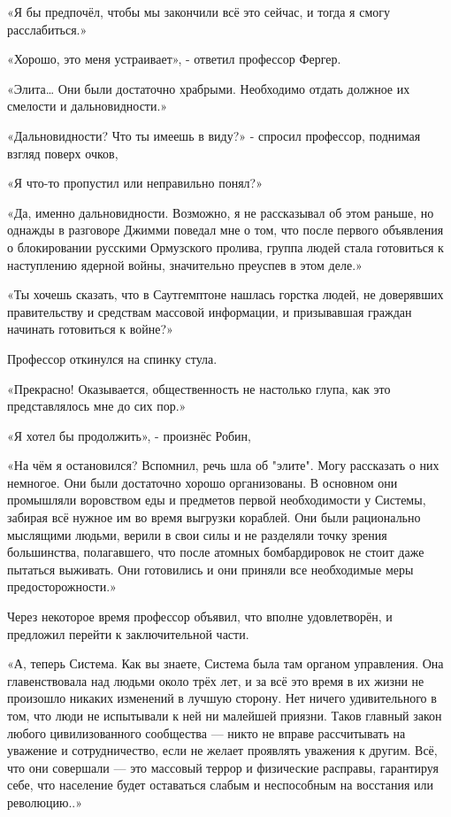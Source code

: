 \documentclass[a4paper,12pt]{book}
\begin{document}
\par
«Я бы предпочёл, чтобы мы закончили всё это сейчас, и тогда я смогу расслабиться.»
\par
«Хорошо, это меня устраивает», - ответил профессор Фергер.
\par
«Элита… Они были достаточно храбрыми. Необходимо отдать должное их смелости и дальновидности.»
\par
«Дальновидности? Что ты имеешь в виду?» - спросил профессор, поднимая взгляд поверх очков,
\par
«Я что-то пропустил или неправильно понял?»
\par
«Да, именно дальновидности. Возможно, я не рассказывал об этом раньше, но однажды в разговоре Джимми поведал мне о том, что после первого объявления о блокировании русскими Ормузского пролива, группа людей стала готовиться к наступлению ядерной войны, значительно преуспев в этом деле.»
\par
«Ты хочешь сказать, что в Саутгемптоне нашлась горстка людей, не доверявших правительству и средствам массовой информации, и призывавшая граждан начинать готовиться к войне?»
\par
Профессор откинулся на спинку стула.
\par
«Прекрасно! Оказывается, общественность не настолько глупа, как это представлялось мне до сих пор.»
\par
«Я хотел бы продолжить», - произнёс Робин,
\par
«На чём я остановился? Вспомнил, речь шла об "элите". Могу рассказать о них немногое. Они были достаточно хорошо организованы. В основном они промышляли воровством еды и предметов первой необходимости у Системы, забирая всё нужное им во время выгрузки кораблей. Они были рационально мыслящими людьми, верили в свои силы и не разделяли точку зрения большинства, полагавшего, что после атомных бомбардировок не стоит даже пытаться выживать. Они готовились и они приняли все необходимые меры предосторожности.»\\
\par
Через некоторое время профессор объявил, что вполне удовлетворён, и предложил перейти к заключительной части.
\par
«А, теперь Система. Как вы знаете, Система была там органом управления. Она главенствовала над людьми около трёх лет, и за всё это время в их жизни не произошло никаких изменений в лучшую сторону. Нет ничего удивительного в том, что люди не испытывали к ней ни малейшей приязни. Таков главный закон любого цивилизованного сообщества — никто не вправе рассчитывать на уважение и сотрудничество, если не желает проявлять уважения к другим. Всё, что они совершали — это массовый террор и физические расправы, гарантируя себе, что население будет оставаться слабым и неспособным на восстания или революцию..»\\
\end{document}
